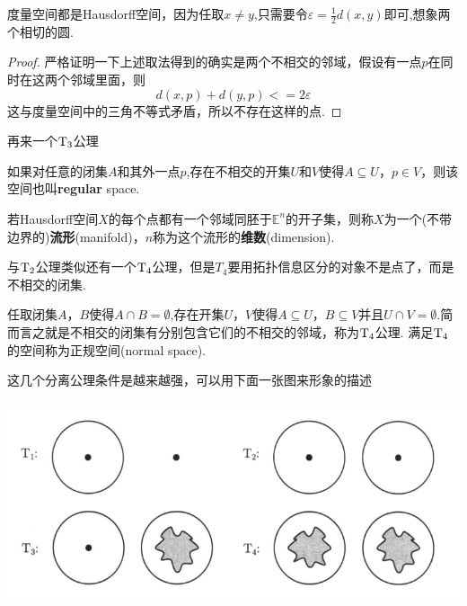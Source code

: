 \begin{example}
度量空间都是\rm Hausdorff空间，因为任取$x \neq y$,只需要令$\varepsilon = \frac{1}{2}d(x,y)$即可,想象两个相切的圆.
\end{example}

\begin{proof}
严格证明一下上述取法得到的确实是两个不相交的邻域，假设有一点$p$在同时在这两个邻域里面，则\[d(x,p) + d(y,p) <= 2\varepsilon\]这与度量空间中的三角不等式矛盾，所以不存在这样的点.
\end{proof}

再来一个$\rm T_3$公理

\begin{definition}
如果对任意的闭集$A$和其外一点$p$,存在不相交的开集$U$和$V$使得$A \subseteq U$，$p \in V$，则该空间也叫\rm \textbf{regular} space.
\end{definition}

\begin{definition}
若\rm Hausdorff空间$X$的每个点都有一个邻域同胚于$\mathbb{E}^n$的开子集，则称$X$为一个(不带边界的)\textbf{流形}(manifold)，$n$称为这个流形的\textbf{维数}(\rm dimension).
\end{definition}


与$\rm T_2$公理类似还有一个$\rm T_4$公理，但是$T_4$要用拓扑信息区分的对象不是点了，而是不相交的闭集.

\begin{definition}
任取闭集$A$，$B$使得$A \cap B = \emptyset$,存在开集$U$，$V$使得$A \subseteq U$，$B \subseteq V$并且$U \cap V = \emptyset$.简而言之就是不相交的闭集有分别包含它们的不相交的邻域，称为$\rm T_4$公理. 满足$\rm T_4$的空间称为\textsf{正规空间}(\rm normal space).
\end{definition}

这几个分离公理条件是越来越强，可以用下面一张图来形象的描述


\begin{center}
\includegraphics[width=14cm, height=6cm]{images/separation-axiom.png}
\end{center}


